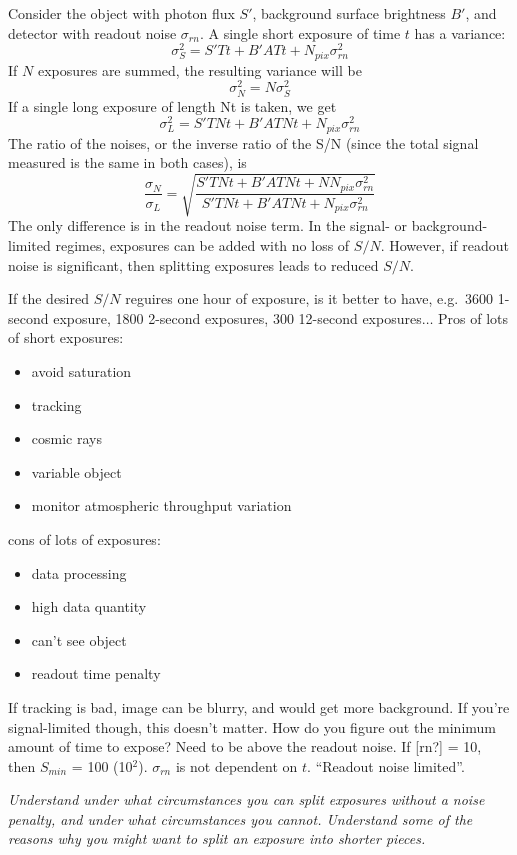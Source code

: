 \documentclass[12pt]{article}
\newcommand{\mynotes}[1]{\textcolor{myBlue}{#1}}
\newcommand{\test}[1]{%
    \begin{center}
        {\parbox{0.9\textwidth}{\textit{\small#1}}}
    \end{center}}
\begin{document}
Consider the object with photon flux $S'$,
background surface brightness $B'$, and detector
with readout noise $\sigma_{rn}$. A single short exposure of
time $t$ has a variance:
\[
    \sigma_{S}^{2} = S'Tt + B'ATt + N_{pix}\sigma_{rn}^{2}
    \]
If $N$ exposures are summed, the resulting variance will be
\[
    \sigma_{N}^{2} = N\sigma_{S}^{2}
    \]
If a single long exposure of length Nt is taken, we get
\[
    \sigma_{L}^{2} = S'TNt + B'ATNt + N_{pix}\sigma_{rn}^{2}
    \]
The ratio of the noises, or the inverse ratio of the S/N (since the
total signal measured is the same in both cases), is
\[
    \frac{\sigma_{N}}{\sigma_{L}} = \sqrt{\frac
    {S'TNt + B'ATNt + NN_{pix}\sigma_{rn}^{2} }
    {S'TNt + B'ATNt + N_{pix}\sigma_{rn}^{2}}}
    \]
The only difference is in the readout noise term. In the signal- or
background-limited regimes, exposures can be added with no loss of $S/N$.
However, if readout noise is significant, then splitting exposures leads to
reduced $S/N$.

\mynotes{If the desired $S/N$ reguires one hour of exposure,
    is it better to have, e.g.\ 3600 1-second exposure, 1800 2-second
    exposures, 300 12-second exposures$\ldots$
    Pros of lots of short exposures:
    \begin{itemize}
        \item avoid saturation
        \item tracking
        \item cosmic rays
        \item variable object
        \item monitor atmospheric throughput variation
    \end{itemize}
    cons of lots of exposures:
    \begin{itemize}
        \item data processing
        \item high data quantity
        \item can't see object
        \item readout time penalty
    \end{itemize}
    If tracking is bad, image can be blurry, and would get more background.
    If you're signal-limited though, this doesn't matter.
    How do you figure out the minimum amount of time to expose?
    Need to be above the readout noise. If [rn?] = 10, then
    $S_{min}$ = 100 (10$^{2}$). $\sigma_{rn}$ is not dependent on $t$.
    ``Readout noise limited''.
}

\test{Understand under what circumstances you can split exposures without
a noise penalty, and under what circumstances you cannot.
Understand some of the reasons why you might want to split an exposure
into shorter pieces.}
\end{document}
